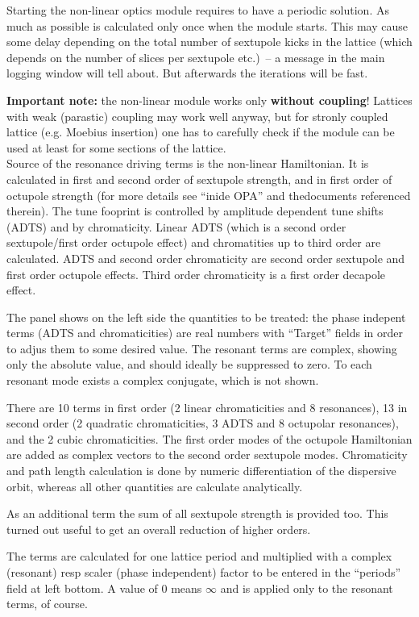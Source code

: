 \documentclass[12pt]{article}
\begin{document}
Starting the non-linear optics module requires to have a periodic solution.
As much as possible is calculated only once when the module starts.
This may cause some delay depending on the total number of sextupole kicks
in the lattice (which depends on the number of slices per sextupole etc.)~-- a message in the main logging window will tell about. But afterwards the iterations will be fast.

{\bf Important note:} the non-linear module works only {\bf without coupling}! Lattices with weak (parastic) coupling may work well anyway, but for stronly coupled lattice (e.g. Moebius insertion) one has to carefully check if the module can be used at least for some sections of the lattice.\\


Source of the resonance driving terms is the non-linear Hamiltonian. It is calculated in first and second order of sextupole strength, and in first order of octupole strength (for more details see ``inide OPA'' and thedocuments referenced therein). The tune fooprint is controlled by amplitude dependent tune shifts (ADTS) and by chromaticity. Linear ADTS (which is a second order sextupole/first order octupole effect) and chromatities up to third order are calculated. ADTS and second order chromaticity are second order sextupole and first order octupole effects. Third order chromaticity is a first order decapole effect.

The panel shows on the left side the quantities to be treated: the phase indepent terms (ADTS and chromaticities) are real numbers with ``Target'' fields in order to adjus them to some desired value. The resonant terms are complex, showing only the absolute value, and should ideally be suppressed to zero. To each resonant mode exists a complex conjugate, which is not shown.

There are 10 terms in first order (2 linear  chromaticities
and 8 resonances), 13 in second order (2 quadratic chromaticities, 3 ADTS and 8 octupolar resonances), and the 2 cubic chromaticities. The first order modes of the octupole Hamiltonian are added as complex vectors to the second order sextupole modes. 
Chromaticity and path length calculation
is done by numeric differentiation of the dispersive orbit, whereas all other quantities are calculate analytically.

As an additional term the sum of all sextupole strength is provided too. This turned out useful to get an overall reduction of higher orders.

The terms are calculated for one lattice period and multiplied with a complex (resonant) resp scaler (phase independent) factor to be entered in the ``periods'' field at left bottom. A value of 0 means $\infty$ and is applied only to
the resonant terms, of course.
\end{document}
